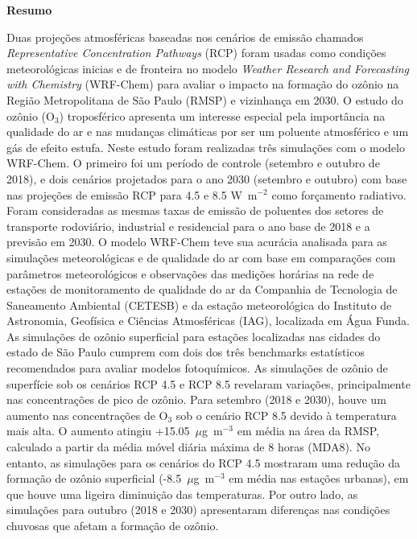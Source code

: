 \begin{spacing}{1.5}
		\begin{center}
			\LARGE \textbf{Resumo}\\[2cm]
		\end{center}
			Duas proje\c{c}\~{o}es atmosf\'{e}ricas baseadas nos cenários de emiss\~{a}o chamados \textit{Representative Concentration Pathways} (RCP) foram usadas como condições meteorol\'{o}gicas inicias e de fronteira no modelo \textit{Weather Research and Forecasting with Chemistry} (WRF-Chem) para avaliar o impacto na formação do ozônio na Região Metropolitana de São Paulo (RMSP) e vizinhança em 2030.
			O estudo do ozônio (O$_3$) troposférico apresenta um interesse especial pela importância na qualidade do ar e nas mudanças climáticas por ser um poluente atmosférico e um gás de efeito estufa.
			Neste estudo foram realizadas três simulações com o modelo WRF-Chem. O primeiro foi um período de controle (setembro e outubro de 2018), e dois cenários projetados para o ano 2030 (setembro e outubro) com base nas projeções de emissão RCP para 4.5 e 8.5 W~m$^{-2}$ como forçamento radiativo.	Foram consideradas as mesmas taxas de emissão de poluentes dos setores de transporte rodoviário, industrial e residencial para o ano base de 2018 e a previsão em 2030.
			O modelo WRF-Chem teve sua acurácia analisada para as simulações meteorológicas e de qualidade do ar com base em comparações com parâmetros meteorológicos e observações das medições horárias na rede de estações de monitoramento de qualidade do ar da Companhia de Tecnologia de Saneamento Ambiental (CETESB) e da estação meteorológica do Instituto de Astronomia, Geofísica e Ciências Atmosféricas (IAG), localizada em Água Funda.
			As simulações de ozônio superficial para estações localizadas nas cidades do estado de São Paulo cumprem com dois dos três benchmarks estatísticos recomendados para avaliar modelos fotoquímicos. As simulações de ozônio de superfície sob os cenários RCP 4.5 e RCP 8.5 revelaram variações, principalmente nas concentrações de pico de ozônio. Para setembro (2018 e 2030), houve um aumento nas concentrações de O$_3$ sob o cenário RCP 8.5 devido à temperatura mais alta. O aumento atingiu +15.05~$\mu$g~m$^{-3}$ em média na área da RMSP, calculado a partir da média móvel diária máxima de 8 horas (MDA8). No entanto, as simulações para os cenários do RCP 4.5 mostraram uma redução da formação de ozônio superficial (-8.5~$\mu$g~m$^{-3}$ em média nas estações urbanas), em que houve uma ligeira diminuição das temperaturas. Por outro lado, as simulações para outubro (2018 e 2030) apresentaram diferenças nas condições chuvosas que afetam a formação de ozônio. 

\end{spacing}
